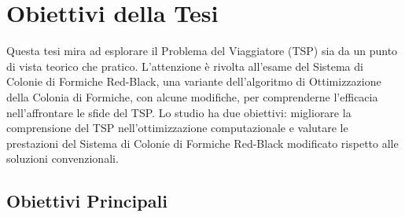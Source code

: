 
\section{Obiettivi della Tesi}



Questa tesi mira ad esplorare il Problema del Viaggiatore (TSP) sia da un punto di vista teorico che pratico. L'attenzione è rivolta all'esame del Sistema di Colonie di Formiche Red-Black, una variante dell'algoritmo di Ottimizzazione della Colonia di Formiche, con alcune modifiche, per comprenderne l'efficacia nell'affrontare le sfide del \gls{TSP}.  Lo studio ha due obiettivi: migliorare la comprensione del \gls{TSP} nell'ottimizzazione computazionale e valutare le prestazioni del Sistema di Colonie di Formiche Red-Black modificato rispetto alle soluzioni convenzionali.

\subsection{Obiettivi Principali}

